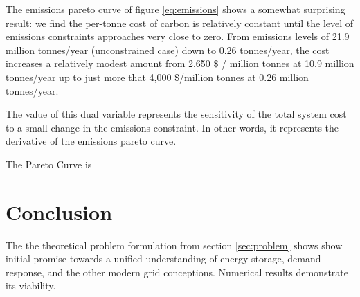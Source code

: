 \documentclass[journal,11pt]{IEEEtran}
\begin{document}
The emissions pareto curve of figure \ref{eq:emissions} shows a somewhat surprising result: we find the per-tonne cost of carbon
is relatively constant until the level of emissions constraints approaches very
close to zero. From emissions levels of 21.9 million tonnes/year (unconstrained case) down to 0.26 tonnes/year, the cost increases
a relatively modest amount from 2,650 \$ / million tonnes at 10.9 million tonnes/year up to just more that 4,000 \$/million tonnes
at 0.26 million tonnes/year. 

The value of this dual variable represents the sensitivity of the total system cost to a small change in the emissions constraint.
In other words, it represents the derivative of the emissions pareto curve. 

The Pareto Curve is 



\section{Conclusion}
The the theoretical problem formulation from section \ref{sec:problem} shows
show initial promise towards a unified understanding of energy storage, demand response, and
the other modern grid conceptions. Numerical results demonstrate its viability.







% 
% 
% 
% 
\end{document}
